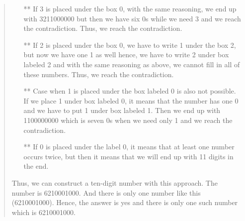 \documentclass[12pt, a4paper]{article}                      %
\begin{document}
\begin{itemize}
\begin{quote}
\begin{itemize}
\item[**]
If 3 is placed under the box 0, with the same reasoning, we end up with 3211000000 but then we have six 0s while we need 3 and we reach the contradiction.
Thus, we reach the contradiction.
\item[**]
If 2 is placed under the box 0, we have to write 1 under the box 2, but now we have one 1 as well hence, we have
to write 2 under box labeled 2 and with the same reasoning as above, we cannot fill in all of these numbers.
Thus, we reach the contradiction.
\item[**]
Case when 1 is placed under the box labeled 0 is also not possible. If we place 1 under box labeled 0, it means that the number has one 0 and we have to put
1 under box labeled 1. Then we end up with 1100000000 which is seven 0s when we need only 1 and we reach the contradiction.
\item[**]
If 0 is placed under the label 0, it means that at least one number occurs twice, but then
it means that we will end up with 11 digits in the end.
\\
\end{itemize}
Thus, we can construct a ten-digit number with this approach. The number is 6210001000.
And there is only one number like this (6210001000). Hence, the answer is yes and there
is only one such number which is 6210001000.
\end{quote}
\end{itemize}
\end{document}

